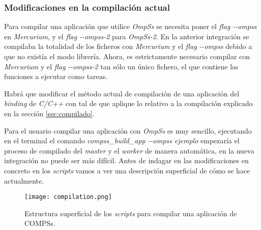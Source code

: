 \subsubsection{Modificaciones en la compilación actual}
\label{sec:modificacioncompilacion}

Para compilar una aplicación que utilice \textit{OmpSs} se necesita poner el \textit{flag} \textit{-{}-ompss} en \textit{Mercurium}, y el \textit{flag} \textit{-{}-ompss-2} para \textit{OmpSs-2}. En la anterior integración se compilaba la totalidad de los ficheros con \textit{Mercurium} y el \textit{flag} \textit{-{}-ompss} debido a que no existía el modo librería. Ahora, es estrictamente necesario compilar con \textit{Mercurium} y el \textit{flag} \textit{-{}-ompss-2} tan sólo un único fichero, el que contiene las funciones a ejecutar como tareas. 
\par\bigskip
Habrá que modificar el método actual de compilación de una aplicación del \textit{binding} de \textit{C/C++} con tal de que aplique lo relativo a la compilación explicado en la sección \ref{sec:compilado}.
\par\bigskip

Para el usuario compilar una aplicación con \textit{OmpSs} es muy sencillo, ejecutando en el terminal el comando \textit{compss\_build\_app -{}-ompss ejemplo} empezaría el proceso de compilado del \textit{master} y el \textit{worker} de manera automática, en la nueva integración no puede ser más difícil. Antes de indagar en las modificaciones en concreto en los \textit{scripts} vamos a ver una descripción superficial de cómo se hace actualmente.

\begin{figure}[H]
    \centering 
    \caption{Estructura superficial de los \textit{scripts} para compilar una aplicación de COMPSs.}
    \texttt{[image: compilation.png]}
    \label{fig:compilado}
\end{figure}

